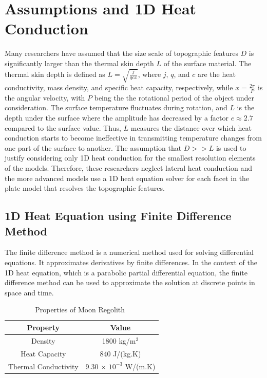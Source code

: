 \documentclass{optica-article}
\begin{document}
\section{Assumptions and 1D Heat Conduction}

Many researchers have assumed that the size scale of topographic features $D$ is significantly larger than the thermal skin depth $L$ of the surface material. The thermal skin depth is defined as $L = \sqrt{\frac{j}{qcx}}$, where $j$, $q$, and $c$ are the heat conductivity, 
mass density, and specific heat capacity, respectively, 
while $x = \frac{2\pi}{P}$ is the angular velocity, with $P$ being the 
the rotational period of the object under consideration.
The surface temperature fluctuates during rotation, and $L$ is the depth 
under the surface where the amplitude has decreased by a factor 
$e \approx 2.7$ compared to the surface value. Thus, $L$ measures 
the distance over which heat conduction starts to become ineffective in 
transmitting temperature changes from one part of the surface to another.
The assumption that $D >> L$ is used to justify considering only 1D heat 
conduction for the smallest resolution elements of the models. 
Therefore, these researchers neglect lateral heat conduction and the more 
advanced models use a 1D heat equation solver for each facet in the 
plate model that resolves the topographic features.

\subsection{1D Heat Equation using Finite Difference Method}



The finite difference method is a numerical method used for solving 
differential equations. It approximates derivatives by finite differences. 
In the context of the 1D heat equation, which is a parabolic partial 
differential equation, the finite difference method can be used to approximate 
the solution at discrete points in space and time.

\begin{table}[H]
	\centering
	\begin{tabular}{|c|c|}
	\hline
	\textbf{Property} & \textbf{Value} \\
	\hline
	Density & 1800 kg/m$^3$ \\
	\hline
	Heat Capacity & 840 J/(kg.K) \\
	\hline
	Thermal Conductivity & 9.30 $\times$ $10^{-3}$ W/(m.K) \\
	\hline
	\end{tabular}
	\caption{Properties of Moon Regolith~\cite{https://doi.org/10.1029/2021EA001968}}
	\label{tab:moon_regolith_properties}
	\end{table}
\end{document}
